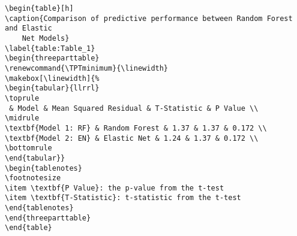 \documentclass[11pt]{article}
\begin{document}
\begin{Verbatim}[tabsize=4]
\begin{table}[h]
\caption{Comparison of predictive performance between Random Forest and Elastic
	Net Models}
\label{table:Table_1}
\begin{threeparttable}
\renewcommand{\TPTminimum}{\linewidth}
\makebox[\linewidth]{%
\begin{tabular}{llrrl}
\toprule
 & Model & Mean Squared Residual & T-Statistic & P Value \\
\midrule
\textbf{Model 1: RF} & Random Forest & 1.37 & 1.37 & 0.172 \\
\textbf{Model 2: EN} & Elastic Net & 1.24 & 1.37 & 0.172 \\
\bottomrule
\end{tabular}}
\begin{tablenotes}
\footnotesize
\item \textbf{P Value}: the p-value from the t-test
\item \textbf{T-Statistic}: t-statistic from the t-test
\end{tablenotes}
\end{threeparttable}
\end{table}

\end{Verbatim}
\end{document}
